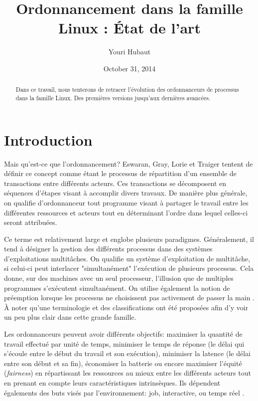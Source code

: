 \documentclass[letterpaper]{article}
\title{Ordonnancement dans la famille Linux : État de l'art}
\date{October 31, 2014}
\author{Youri Hubaut}
\begin{document}
\maketitle

\begin{abstract}

Dans ce travail, nous tenterons de retracer l'évolution des ordonnanceurs de processus dans la famille Linux. Des premières versions jusqu'aux dernières avancées.

\end{abstract}

\section{Introduction}

Mais qu'est-ce que l'ordonnancement? Eswaran, Gray, Lorie et Traiger \citep{Eswaran:1976:NPC:360363.360369} tentent de définir ce concept comme étant le processus de répartition d'un ensemble de transactions entre différents acteurs. Ces transactions se décomposent en séquences d'étapes visant à accomplir divers travaux. De manière plus générale, on qualifie d'ordonnanceur tout programme visant à partager le travail entre les différentes ressources et acteurs tout en déterminant l'ordre dans lequel celles-ci seront attribuées.

Ce terme est relativement large et englobe plusieurs paradigmes. Généralement, il tend à désigner la gestion des différents processus dans des systèmes d'exploitations multitâches. On qualifie un système d'exploitation de multitâche, si celui-ci peut interlacer "simultanément" l'exécution de plusieurs processus. Cela donne, sur des machines avec un seul processeur, l'illusion que de multiples programmes s'exécutent simultanément. On utilise également la notion de préemption lorsque les processus ne choisissent pas activement de passer la main \citep{Bach:1986:DUO:8570}. À noter qu'une terminologie \citep{Casavant:1988:TSG:630789.630963} et des classifications \citep{DBLP:journals/tc/WangM85} ont été proposées afin d'y voir un peu plus clair dans cette grande famille.

Les ordonnanceurs peuvent avoir différents objectifs: maximiser la quantité de travail effectué par unité de temps, minimiser le temps de réponse (le délai qui s'écoule entre le début du travail et son exécution), minimiser la latence (le délai entre son début et sa fin), économiser la batterie ou encore maximiser l'équité (\textit{fairness}) en répartissant les ressources au mieux entre les différents acteurs tout en prenant en compte leurs caractéristiques intrinsèques.
Ils dépendent égalements des buts visés par l'environnement: job, interactive, ou temps réel \citep{Hansen:1973:OSP:540365}.
\end{document}
